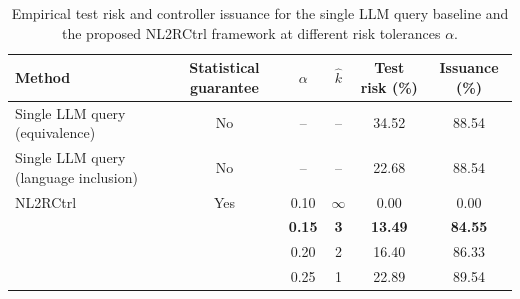 \begin{table}[t]
\centering
\caption{Empirical test risk and controller issuance
for the single LLM query baseline and the proposed
NL2RCtrl framework at different risk tolerances $\alpha$.}
\label{tab:crc_results}
\small
\setlength{\tabcolsep}{3pt}
\begin{tabular}{lccccc}
\toprule
Method & Statistical guarantee & $\alpha$ & $\widehat{k}$
& Test risk (\%) & Issuance (\%) \\
\midrule
Single LLM query (equivalence) & No & -- & -- & 34.52 & 88.54 \\
Single LLM query (language inclusion) & No & -- & -- & 22.68 & 88.54 \\
\midrule
NL2RCtrl & Yes & 0.10 & $\infty$ & 0.00 & 0.00 \\
 &  & \textbf{0.15} & \textbf{3} & \textbf{13.49} & \textbf{84.55} \\
 &  & 0.20 & 2 & 16.40 & 86.33 \\
 &  & 0.25 & 1 & 22.89 & 89.54 \\
\bottomrule
\end{tabular}
\end{table}
